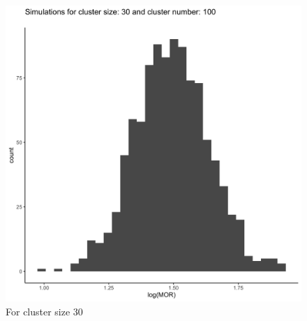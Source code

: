 \documentclass[
  letterpaper,
  DIV=11,
  numbers=noendperiod,
  titlepage]{scrartcl}
\begin{document}
\begin{figure}
\begin{minipage}[t]{0.50\linewidth}
{{\includegraphics{../plots/ran-int/hist_100_30.png}

}

\caption{For cluster size 30}

}

\end{minipage}%
%
\begin{minipage}[t]{0.50\linewidth}

{\centering 

}
\end{minipage}
\end{figure}
\end{document}
